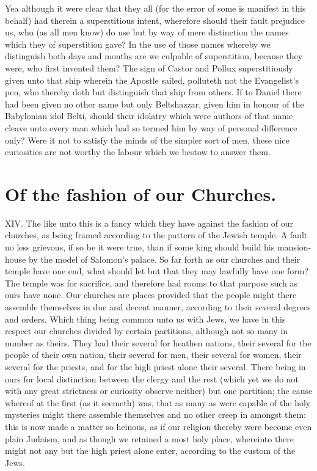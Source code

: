 Yea although it were clear that they all (for the error of some is manifest in this behalf) had therein a superstitious intent, wherefore should their fault prejudice us, who (as all men know) do use but by way of mere distinction the names which they of superstition gave? In the use of those names whereby we distinguish both days and months are we culpable of superstition, because they were, who first invented them? The sign of Castor and Pollux superstitiously given unto that ship wherein the Apostle sailed, polluteth not the Evangelist’s pen, who thereby doth but distinguish that ship from others. If to Daniel there had been given no other name but only Beltshazzar, given him in honour of the Babylonian idol Belti, should their idolatry which were authors of that name cleave unto every man which had so termed him by way of personal difference only? Were it not to satisfy the minds of the simpler sort of men, these nice curiosities are not worthy the labour which we bestow to answer them.


\section*{Of the fashion of our Churches.}
XIV. The like unto this is a fancy which they have against the fashion of our churches, as being framed according to the pattern of the Jewish temple. A fault no less grievous, if so be it were true, than if some king should build his mansion-house by the model of Salomon’s palace. So far forth as our churches and their temple have one end, what should let but that they may lawfully have one form? The temple was for sacrifice, and therefore had rooms to that purpose such as ours have none. Our churches are places provided that the people might there assemble themselves in due and decent manner, according to their several degrees and orders. Which thing being common unto us with Jews,  we have in this respect our churches divided by certain partitions, although not so many in number as theirs. They had their several for heathen nations, their several for the people of their own nation, their several for men, their several for women, their several for the priests, and for the high priest alone their several. There being in ours for local distinction between the clergy and the rest (which yet we do not with any great strictness or curiosity observe neither) but one partition; the cause whereof at the first (as it seemeth) was, that as many as were capable of the holy mysteries might there assemble themselves and no other creep in amongst them: this is now made a matter so heinous, as if our religion thereby were become even plain Judaism, and as though we retained a most holy place, whereinto there might not any but the high priest alone enter, according to the custom of the Jews.

